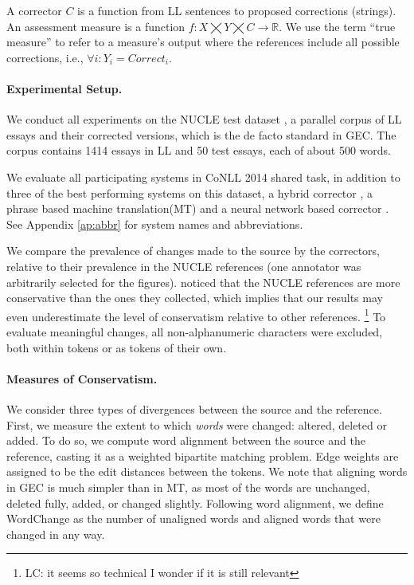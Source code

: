 \documentclass[letterpaper, 11pt]{article}
\newcommand{\lc}[1]{\footnote{\color{blue}LC: #1}}
\begin{document}
A corrector $C$ is a function from LL sentences to proposed corrections (strings).
An assessment measure is a function $f\colon X\bigtimes Y\bigtimes C\to \mathbb{R}$. We use the term ``true measure'' to refer to a measure's output where the references include all possible corrections, i.e., $\forall i\colon Y_i=Correct_i$.

\paragraph{Experimental Setup.}\label{par:experimental_setup}
We conduct all experiments on the NUCLE test dataset \cite{dahlmeier2013building},
a parallel corpus of LL essays and their corrected versions,
which is the de facto standard in GEC.
The corpus contains 1414 essays in LL and 50 test essays, each of about 500 words.

We evaluate all participating systems in CoNLL 2014 shared task,
in addition to three of the best performing systems on this dataset, a hybrid corrector \cite{rozovskaya2016grammatical}, a phrase based machine translation(MT) \cite{junczysdowmunt-grundkiewicz:2016:EMNLP2016} and a neural network based corrector \cite{xie2016neural}.
See Appendix \ref{ap:abbr} for system names and abbreviations. %

We compare the prevalence of changes made to the source by the correctors,
relative to their prevalence in the NUCLE references (one annotator was arbitrarily selected for the figures).  noticed that the NUCLE references are more conservative than the ones they collected, which implies that our results may even underestimate the level of conservatism relative to other references.
\lc{it seems so technical I wonder if it is still relevant} To evaluate meaningful changes, all non-alphanumeric characters were excluded, both within tokens or as tokens of their own.

\paragraph{Measures of Conservatism.}
We consider three types of divergences between the source and the reference.
First, we measure the extent to which \emph{words} were changed: altered, deleted or added.
To do so, we compute word alignment between the source and the reference, casting it
as a weighted bipartite matching problem. Edge weights are assigned to be the edit distances between the tokens.
We note that aligning words in GEC is much simpler than in MT,
as most of the words are unchanged, deleted fully, added, or changed slightly.
Following word alignment, we define {\sc WordChange}
as the number of unaligned words and aligned words that were changed in any way.
\end{document}

